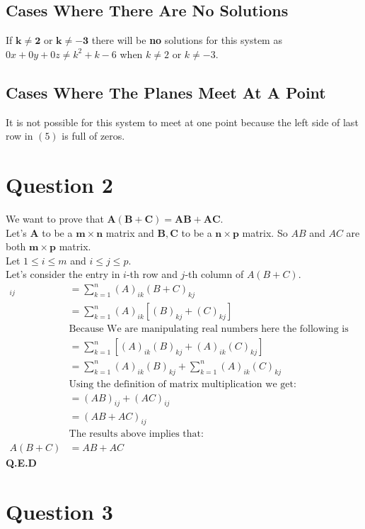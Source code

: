 \documentclass[12pt]{article}
\begin{document}
\subsection{Cases Where There Are No Solutions}
If $\bm{k \neq 2}$ or $\bm{k \neq -3}$ there will be {\bf no} solutions for this system as $0x + 0y + 0z \neq k^2+k-6$ when $k \neq 2$ or $k \neq -3$.

\subsection{Cases Where The Planes Meet At A Point}
It is not possible for this system to meet at one point because the left side of last row in $(5)$ is full of zeros. 

\newpage

\section{Question 2}
We want to prove that $\bm{A(B+C)=AB+AC}$.\\
Let's $\bm{A}$ to be a $\bm{m \times n}$ matrix and $\bm{B,C}$ to be a  $\bm{n \times p}$ matrix.
So $AB$ and $AC$ are both $\bm{m \times p}$ matrix. \\
Let $1 \leq i \leq m$ and $i \leq j \leq p$.\\
Let's consider the entry in $i$-th row and $j$-th column of $A(B+C)$.
\begin{align*}
[A(B+C)]_{ij}&=\sum^n_{k=1}(A)_{ik}(B+C)_{kj}\\
&=\sum^n_{k=1}(A)_{ik}\left[(B)_{kj}+(C)_{kj}\right]\\
&\text{Because We are manipulating real numbers here the following is allowed:}\\
&=\sum^n_{k=1}\left[(A)_{ik}(B)_{kj}+(A)_{ik}(C)_{kj}\right]\\
&=\sum^n_{k=1}(A)_{ik}(B)_{kj}+\sum^n_{k=1}(A)_{ik}(C)_{kj}\\
&\text{Using the definition of matrix multiplication we get:}\\
&=(AB)_{ij}+(AC)_{ij}\\
&=(AB+AC)_{ij}\\
&\text{The results above implies that:}\\
A(B+C)&=AB+AC
\end{align*}
{\bf Q.E.D}
\newpage

\section{Question 3}
\end{document}
